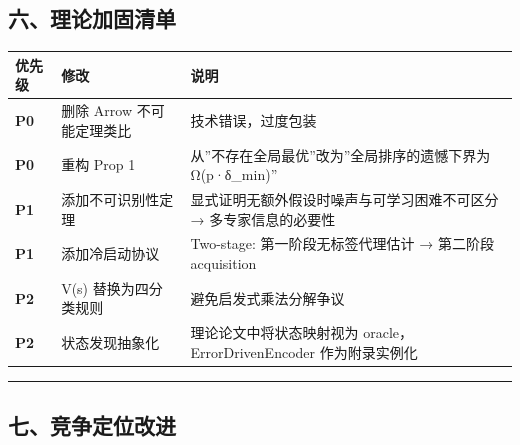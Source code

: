 \documentclass[
  12pt,
]{ctexart}
\begin{document}
\subsection{六、理论加固清单}\label{ux516dux7406ux8bbaux52a0ux56faux6e05ux5355}

\begin{longtable}[]{@{}
  >{\raggedright\arraybackslash}p{}
  >{\raggedright\arraybackslash}p{}
  >{\raggedright\arraybackslash}p{}@{}}
\toprule\noalign{}
\begin{minipage}[b]{\linewidth}\raggedright
优先级
\end{minipage} & \begin{minipage}[b]{\linewidth}\raggedright
修改
\end{minipage} & \begin{minipage}[b]{\linewidth}\raggedright
说明
\end{minipage} \\
\midrule\noalign{}
\endhead
\bottomrule\noalign{}
\endlastfoot
\textbf{P0} & 删除 Arrow 不可能定理类比 & 技术错误，过度包装 \\
\textbf{P0} & 重构 Prop 1 &
从''不存在全局最优''改为''全局排序的遗憾下界为 Ω(p·δ\_min)'' \\
\textbf{P1} & 添加不可识别性定理 &
显式证明无额外假设时噪声与可学习困难不可区分 → 多专家信息的必要性 \\
\textbf{P1} & 添加冷启动协议 & Two-stage: 第一阶段无标签代理估计 →
第二阶段 acquisition \\
\textbf{P2} & V(s) 替换为四分类规则 & 避免启发式乘法分解争议 \\
\textbf{P2} & 状态发现抽象化 & 理论论文中将状态映射视为
oracle，ErrorDrivenEncoder 作为附录实例化 \\
\end{longtable}

\begin{center}\rule{0.5\linewidth}{0.5pt}\end{center}

\subsection{七、竞争定位改进}\label{ux4e03ux7adeux4e89ux5b9aux4f4dux6539ux8fdb}
\end{document}
